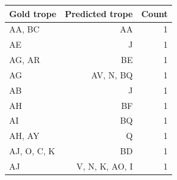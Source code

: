 \begin{tabular}{lrr}
\toprule
Gold trope & Predicted trope & Count \\
\midrule
AA, BC & AA & 1 \\
AE & J & 1 \\
AG, AR & BE & 1 \\
AG & AV, N, BQ & 1 \\
AB & J & 1 \\
AH & BF & 1 \\
AI & BQ & 1 \\
AH, AY & Q & 1 \\
AJ, O, C, K & BD & 1 \\
AJ & V, N, K, AO, I & 1 \\
\bottomrule
\end{tabular}
